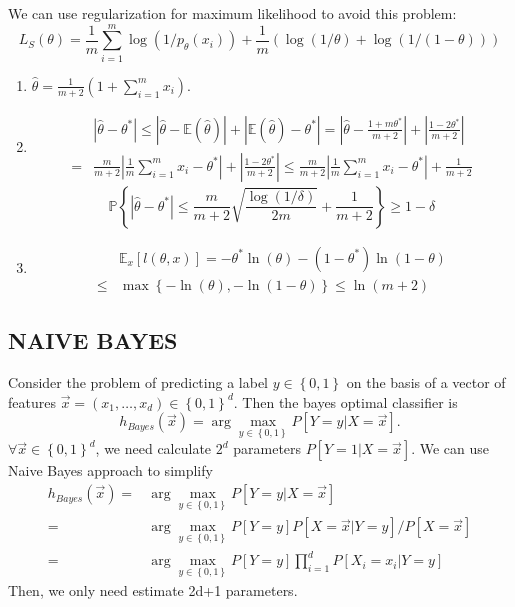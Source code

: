 We can use regularization for maximum likelihood to avoid this problem:
\[
    L_S(\theta) = \frac{1}{m} \sum^{m}_{i=1} \log(1/p_{\theta}(x_i)) + \frac{1}{m} (\log(1/\theta) + \log(1/ (1 - \theta)))
\]
\begin{enumerate}
    \item $ \hat\theta = \frac{1}{m+2} \left( 1 + \sum^{m}_{i=1} x_i \right). $
    \item 
        \begin{align*}
            &\left| \hat\theta - \theta^* \right| 
            \le \left| \hat \theta - \mathbb{E}(\hat \theta) \right| + \left| \mathbb{E}(\hat \theta) - \theta^* \right|
            = \left| \hat\theta - \frac{1 + m \theta^*}{m+2}  \right| + \left| \frac{1 - 2\theta^*}{m+2}  \right|\\
            =& \frac{m}{m+2} \left| \frac{1}{m} \sum^{m}_{i=1} x_i - \theta^* \right| + \left| \frac{1 - 2\theta^*}{m+2}  \right| \le \frac{m}{m+2} \left| \frac{1}{m} \sum^{m}_{i=1} x_i - \theta^* \right| + \frac{1}{m+2}
        \end{align*}
        \[
            \mathbb{P}\left\{ \left| \hat\theta - \theta^* \right| \le \frac{m}{m+2} \sqrt{\frac{\log(1/\delta)}{2m} } + \frac{1}{m+2}  \right\} \ge 1 - \delta
        \]
    \item 
        \begin{align*}
            &\mathbb{E}_{x}\left[ l(\theta, x) \right] 
            = - \theta^* \ln(\theta) - (1-\theta^*) \ln(1 - \theta)\\
            \le& \max \left\{ -\ln(\theta), -\ln(1 - \theta) \right\}
            \le \ln(m+2)
        \end{align*}
\end{enumerate}

\subsection{NAIVE BAYES}%

Consider the problem of predicting a label $ y \in \left\{ 0,1 \right\} $ on the basis of a vector of features $ \vec{x} = (x_1, \ldots, x_d) \in {\left\{ 0,1 \right\}}^d $. Then the bayes optimal classifier is
\[
    h_{Bayes}(\vec{x}) = \arg\max_{y \in \left\{ 0,1 \right\}} P\left[ Y = y | X = \vec{x} \right].
\]
$ \forall \vec{x} \in {\left\{ 0,1 \right\}}^d $, we need calculate $ 2^d $ parameters $ P\left[ Y = 1 | X = \vec{x} \right] $.
We can use Naive Bayes approach to simplify
\begin{align*}
    h_{Bayes}(\vec{x}) =& \arg\max_{y \in \left\{ 0,1 \right\}} P\left[ Y = y | X = \vec{x} \right]\\
    =& \arg\max_{y \in \left\{ 0,1 \right\}} P\left[ Y=y \right] P \left[ X = \vec{x} | Y = y \right] / P\left[ X = \vec{x} \right]\\
    =& \arg\max_{y \in \left\{ 0,1 \right\}} P[Y=y] \prod^d_{i=1}P\left[ X_i = x_i | Y = y \right]
\end{align*}
Then, we only need estimate 2d+1 parameters.

